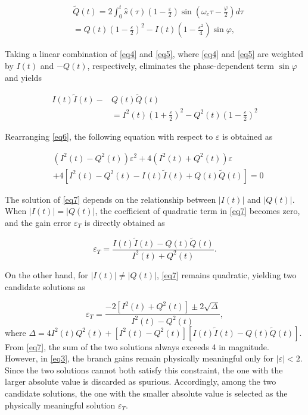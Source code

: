\documentclass[lettersize,journal]{IEEEtran}
\begin{document}
\begin{equation}
\label{eq5}
\begin{split}
&\tilde Q(t) 
= 2 \int_{0}^{t} \hat s(\tau) \left(1-\frac{\varepsilon}{2}\right) \sin \left(\omega_c \tau - \frac{\varphi}{2}\right) d\tau \\
&= Q(t) \left(1-\frac{\varepsilon}{2}\right)^2 - I(t) \left(1-\frac{\varepsilon^2}{4}\right) \sin \varphi,
\end{split}
\end{equation}

Taking a linear combination of \eqref{eq4} and \eqref{eq5}, where \eqref{eq4} and \eqref{eq5} are weighted by $I(t)$ and $-Q(t)$, respectively, eliminates the phase-dependent term $\sin \varphi$ and yields

\begin{equation}
    \label{eq6}
    \begin{split}
    I(t)\tilde{I}(t) - &Q(t)\tilde{Q}(t) \\ 
    &= I^2(t)\left(1+\frac{\varepsilon}{2}\right)^2- Q^2(t)\left(1-\frac{\varepsilon}{2}\right)^2
    \end{split}
\end{equation}

Rearranging \eqref{eq6}, the following equation with respect to $\varepsilon$ is obtained as

\begin{equation}
    \label{eq7}
    \begin{split}
    &(I^2(t) - Q^2(t))\varepsilon^2 + 4(I^2(t) + Q^2(t))\varepsilon\\
    & + 4[I^2(t)-Q^2(t) -I(t)\tilde{I}(t) + Q(t)\tilde{Q}(t)] = 0   
    \end{split}   
\end{equation}

The solution of \eqref{eq7} depends on the relationship between $|I(t)|$ and $|Q(t)|$.
When $|I(t)| = |Q(t)|$, the coefficient of quadratic term in \eqref{eq7} becomes zero, and the gain error $\varepsilon_T$ is directly obtained as

\begin{equation}
\label{eq8}
\varepsilon_T =
\frac{I(t) \tilde I(t) - Q(t) \tilde Q(t)}{I^2(t) + Q^2(t)}.
\end{equation}

On the other hand, for $|I(t)| \neq |Q(t)|$, \eqref{eq7} remains quadratic, yielding two candidate solutions as

\begin{equation}
\label{eq9}
\varepsilon_T =
\frac{-2[I^2(t) + Q^2(t)] \pm
2\sqrt{\Delta}}
{I^2(t) - Q^2(t)},
\end{equation}
where $\Delta = 4I^2(t)Q^2(t)+[I^2(t)-Q^2(t)][I(t) \tilde I(t) - Q(t) \tilde Q(t)]$.
From \eqref{eq7}, the sum of the two solutions always exceeds 4 in magnitude.
However, in \eqref{eq3}, the branch gains remain physically meaningful only for $|\varepsilon|<2$.
Since the two solutions cannot both satisfy this constraint, the one with the larger absolute value is discarded as spurious.
Accordingly, among the two candidate solutions, the one with the smaller absolute value is selected as the physically meaningful solution $\varepsilon_T$.
\end{document}
